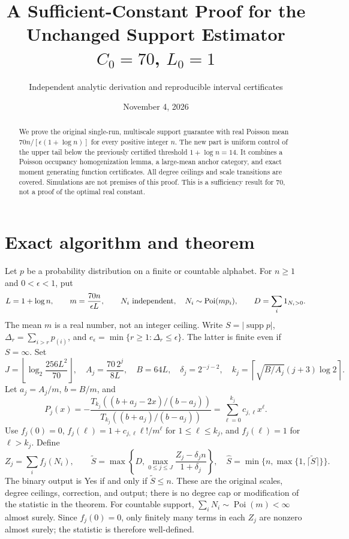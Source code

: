 \documentclass[11pt]{article}
\title{A Sufficient-Constant Proof for the Unchanged Support Estimator\\$C_0=70$, $L_0=1$}
\author{Independent analytic derivation and reproducible interval certificates}
\date{November 4, 2026}
\newcommand{\Poi}{\operatorname{Poi}}
\begin{document}
\maketitle
\begin{abstract}
We prove the original single-run, multiscale support guarantee with real
Poisson mean $70n/[\epsilon(1+\log n)]$ for every positive integer $n$.
The new part is uniform control of the upper tail below the previously
certified threshold $1+\log n=14$. It combines a Poisson occupancy
homogenization lemma, a large-mean anchor category, and exact moment
generating function certificates. All degree ceilings and scale transitions
are covered. Simulations are not premises of this proof. This is a
sufficiency result for 70, not a proof of the optimal real constant.
\end{abstract}

\section{Exact algorithm and theorem}
Let $p$ be a probability distribution on a finite or countable alphabet.
For $n\ge1$ and $0<\epsilon<1$, put
\[
 L=1+\log n,\qquad m=\frac{70n}{\epsilon L},\qquad
 N_i\ \hbox{independent},\quad N_i\sim\Poi(mp_i),\qquad
 D=\sum_i1_{N_i>0}.
\]
The mean $m$ is a real number, not an integer ceiling. Write
$S=|\operatorname{supp}p|$,
$\Delta_r=\sum_{i>r}p_{(i)}$, and
$e_\epsilon=\min\{r\ge1:\Delta_r\le\epsilon\}$.
The latter is finite even if $S=\infty$.
Set
\[
 J=\left\lfloor\log_2\frac{256L^2}{70}\right\rfloor,\quad
 A_j=\frac{70\,2^j}{8L},\quad B=64L,\quad
 \delta_j=2^{-j-2},\quad
 k_j=\left\lceil\sqrt{B/A_j}(j+3)\log2\right\rceil.
\]
Let $a_j=A_j/m$, $b=B/m$, and
\[
 P_j(x)=-\frac{T_{k_j}((b+a_j-2x)/(b-a_j))}
                  {T_{k_j}((b+a_j)/(b-a_j))}
       =\sum_{\ell=0}^{k_j}c_{j,\ell}x^\ell.
\]
Use $f_j(0)=0$, $f_j(\ell)=1+c_{j,\ell}\ell!/m^\ell$ for
$1\le\ell\le k_j$, and $f_j(\ell)=1$ for $\ell>k_j$. Define
\[
 Z_j=\sum_i f_j(N_i),\qquad
 \widetilde S=\max\left\{D,\max_{0\le j\le J}
                   \frac{Z_j-\delta_j n}{1+\delta_j}\right\},\quad
 \widehat S=\min\{n,\max\{1,\lceil\widetilde S\rceil\}\}.
\]
The binary output is Yes if and only if $\widetilde S\le n$.
These are the original scales, degree ceilings, correction, and output;
there is no degree cap or modification of the statistic in the theorem.
For countable support, $\sum_iN_i\sim\Poi(m)<\infty$ almost surely.
Since $f_j(0)=0$, only finitely many terms in each $Z_j$ are nonzero
almost surely; the statistic is therefore well-defined.
\end{document}
